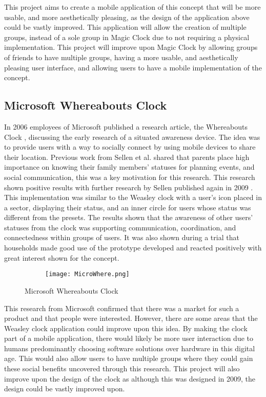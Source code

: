 This project aims to create a mobile application of this concept that will be more usable, and more aesthetically pleasing, as the design of the application above could be vastly improved. This application will allow the creation of multiple groups, instead of a sole group in Magic Clock due to not requiring a physical implementation. This project will improve upon Magic Clock by allowing groups of friends to have multiple groups, having a more usable, and aesthetically pleasing user interface, and allowing users to have a mobile implementation of the concept.

\subsection{Microsoft Whereabouts Clock}

In 2006 employees of Microsoft published a research article, the Whereabouts Clock \cite{micrWher}, discussing the early research of a situated awareness device. The idea was to provide users with a way to socially connect by using mobile devices to share their location. Previous work from Sellen et al. \cite{sellen} shared that parents place high importance on knowing their family members' statuses for planning events, and social communication, this was a key motivation for this research. This research shown positive results with further research by Sellen published again in 2009 \cite{sellen2009}. This implementation was similar to the Weasley clock with a user's icon placed in a sector, displaying their status, and an inner circle for users whose status was different from the presets. The results shown that the awareness of other users' statuses from the clock was supporting communication, coordination, and connectedness within groups of users. It was also shown during a trial that households made good use of the prototype developed and reacted positively with great interest shown for the concept.

\begin{figure}[!htbp]
    \centering
    \begin{subfigure}[b]{0.5\textwidth}
        {\texttt{[image: MicroWhere.png]}}
    \end{subfigure}
    \caption{Microsoft Whereabouts Clock}
    \label{fig:microWhere}
\end{figure}
\FloatBarrier

This research from Microsoft confirmed that there was a market for such a product and that people were interested. However, there are some areas that the Weasley clock application could improve upon this idea. By making the clock part of a mobile application, there would likely be more user interaction due to humans predominantly choosing software solutions over hardware in this digital age. This would also allow users to have multiple groups where they could gain these social benefits uncovered through this research. This project will also improve upon the design of the clock as although this was designed in 2009, the design could be vastly improved upon. 




